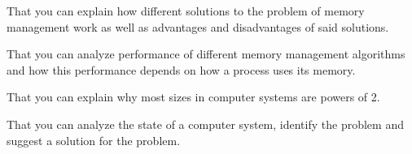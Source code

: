 \item That you can explain how different solutions to the problem of memory 
management work as well as advantages and disadvantages of said solutions.
\item That you can analyze performance of different memory management 
algorithms and how this performance depends on how a process uses its memory.
\item That you can explain why most sizes in computer systems are powers of 2.
\item That you can analyze the state of a computer system, identify the problem 
and suggest a solution for the problem.
